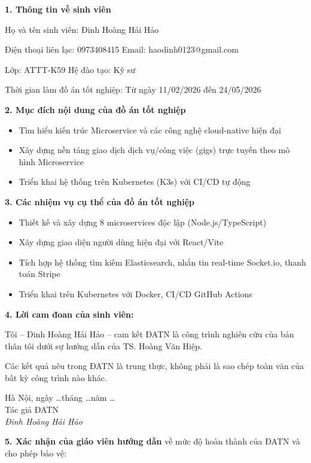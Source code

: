 \documentclass[12pt]{extreport}
\begin{document}
\textbf{1. Thông tin về sinh viên}

Họ và tên sinh viên: Đinh Hoàng Hải Hảo

Điện thoại liên lạc: 0973408415 \hspace{1cm} Email: haodinh0123@gmail.com

Lớp: ATTT-K59 \hspace{2cm} Hệ đào tạo: Kỹ sư

Thời gian làm đồ án tốt nghiệp: Từ ngày 11/02/2026 đến 24/05/2026

\bigskip
\textbf{2. Mục đích nội dung của đồ án tốt nghiệp}
\begin{itemize}
    \item Tìm hiểu kiến trúc Microservice và các công nghệ cloud-native hiện đại
    \item Xây dựng nền tảng giao dịch dịch vụ/công việc (gigs) trực tuyến theo mô hình Microservice
    \item Triển khai hệ thống trên Kubernetes (K3s) với CI/CD tự động
\end{itemize}

\textbf{3. Các nhiệm vụ cụ thể của đồ án tốt nghiệp}
\begin{itemize}
    \item Thiết kế và xây dựng 8 microservices độc lập (Node.js/TypeScript)
    \item Xây dựng giao diện người dùng hiện đại với React/Vite
    \item Tích hợp hệ thống tìm kiếm Elasticsearch, nhắn tin real-time Socket.io, thanh toán Stripe
    \item Triển khai trên Kubernetes với Docker, CI/CD GitHub Actions
\end{itemize}

\textbf{4. Lời cam đoan của sinh viên:}

Tôi -- Đinh Hoàng Hải Hảo -- cam kết ĐATN là công trình nghiên cứu của bản thân tôi dưới sự hướng dẫn của TS. Hoàng Văn Hiệp.

Các kết quả nêu trong ĐATN là trung thực, không phải là sao chép toàn văn của bất kỳ công trình nào khác.

\begin{flushright}
    Hà Nội, ngày \ldots tháng \ldots năm \ldots\\[0.5cm]
    Tác giả ĐATN\\[1cm]
    \textit{Đinh Hoàng Hải Hảo}
\end{flushright}

\textbf{5. Xác nhận của giáo viên hướng dẫn} về mức độ hoàn thành của ĐATN và cho phép bảo vệ:
\end{document}
